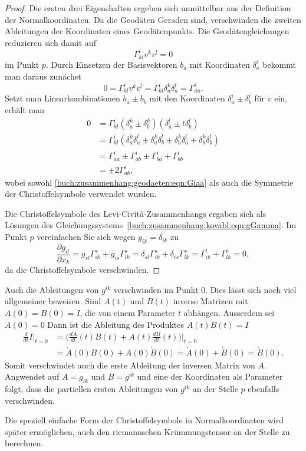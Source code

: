\begin{proof}
Die ersten drei Eigenshaften ergeben sich unmittelbar aus der Definition
der Normalkoordinaten.
Da die Geodäten Geraden sind, verschwinden die zweiten Ableitungen
der Koordinaten eines Geodätenpunkts.
Die Geodätengleichungen reduzieren sich damit auf
\[
\Gamma^i_{kl} v^kv^l = 0
\]
im Punkt $p$.
Durch Einsetzen der Basisvektoren $b_a$ mit Koordinaten $\delta_a^i$
bekommt man daraus zunächst
\begin{equation}
0
=
\Gamma^i_{kl}v^kv^l
=
\Gamma^i_{kl}\delta_a^k\delta_a^l
=
\Gamma^i_{aa}.
\label{buch:zusammenhang:geodaeten:eqn:Giaa}
\end{equation}
Setzt man Linearkombinationen $b_a\pm b_b$ mit den Koordinaten
$\delta_a^i\pm \delta_b^i$ für $v$ ein, erhält man
\begin{align*}
0
&=
\Gamma^i_{kl} (\delta_a^k \pm \delta_b^k)(\delta_a^l \pm t\delta_b^l)
\\
&=
\Gamma^i_{kl}(\delta_a^k\delta_a^l
\pm \delta_a^k\delta_b^l
\pm \delta_b^k\delta_a^l
+ \delta_b^k\delta_b^l)
\\
&=
\Gamma^i_{aa}
\pm
\Gamma^i_{ab}
\pm
\Gamma^i_{ba}
+
\Gamma^i_{bb}
\\
&=
\pm
2
\Gamma^i_{ab},
\end{align*}
wobei sowohl
\eqref{buch:zusammenhang:geodaeten:eqn:Giaa}
als auch die Symmetrie der Christoffelsymbole verwendet wurden.

Die Christoffelsymbole des Levi-Cività-Zusammenhangs ergaben sich
als Lösungen des Gleichungssystems~\ref{buch:zusammenhang:kovabl:eqn:gGamma}.
Im Punkt $p$ vereinfachen Sie sich wegen $g_{ik}=\delta_{ik}$ zu
\[
\frac{\partial g_{il}}{\partial x_k}
=
g_{sl}\Gamma^s_{ik}
+
g_{is}\Gamma^s_{lk}
=
\delta_{sl}\Gamma^s_{ik}
+
\delta_{is}\Gamma^s_{lk}
=
\Gamma^l_{ik}
+
\Gamma^i_{lk}
=
0,
\]
da die Christoffelsymbole verschwinden.
\end{proof}

Auch die Ableitungen von $g^{ik}$ verschwinden im Punkt $0$.
Dies lässt sich noch viel allgemeiner beweisen.
Sind $A(t)$ und $B(t)$ inverse Matrizen mit $A(0)=B(0)=I$, die von einem
Parameter $t$ abhängen.
Ausserdem sei $\dot{A}(0)=0$
Dann ist die Ableitung des Produktes $A(t)B(t)=I$
\begin{align*}
\frac{d}{dt}I\bigg|_{t=0}
&=
\biggl(
\frac{dA}{dt}(t) B(t)
+
A(t)
\frac{dB}{dt}(t)
\biggr)\bigg|_{t=0}
\\
&=
\dot{A}(0)
B(0)
+
A(0)
\dot{B}(0)
=
\dot{A}(0)
+
\dot{B}(0)
=
\dot{B}(0).
\end{align*}
Somit verschwindet auch die erste Ableitung der inversen Matrix von $A$.
Angwendet auf $A=g_{ik}$ und $B=g^{ik}$ und eine der Koordinaten als
Parameter folgt, dass die partiellen ersten Ableitungen von $g^{ik}$
an der Stelle $p$ ebenfalls verschwinden.

Die speziell einfache Form der Christoffelsymbole in Normalkoordinaten
wird später ermöglichen, auch den riemannschen Krümmungstensor an der
Stelle zu berechnen.



